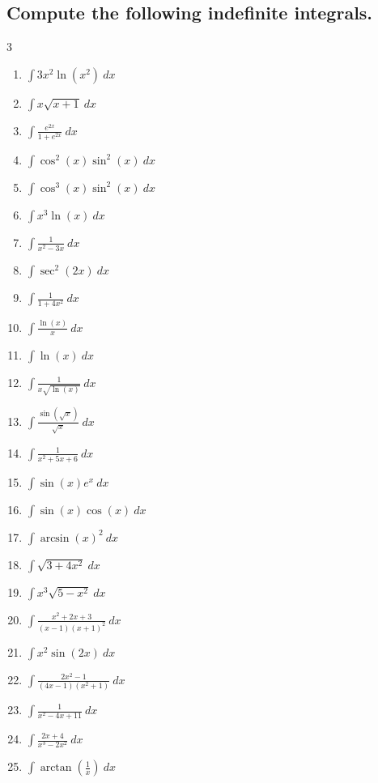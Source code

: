 \documentclass{article}
\begin{document}
\subsection{Compute the following indefinite integrals.}
\begin{multicols}{3}
\begin{enumerate}
\setlength{\itemsep}{0pt}
\item $\displaystyle \int 3x^2\ln(x^2)\ dx$
\item $\displaystyle \int x \sqrt{x+1}\ dx$
\item $\displaystyle \int \frac{e^{2 x}}{1+e^{2 x}} \ d x$
\item $\displaystyle \int  \cos^2(x)\sin^2(x)  \ d x$
\item $\displaystyle \int \cos ^3 (x) \sin ^2 (x)\ d x$
\item $\displaystyle \int x^3 \ln (x)\ d x$
\item $\displaystyle \int \frac{1}{x^2-3 x}\ dx$
\item $\displaystyle \int  \sec ^2(2 x)\ d x$
\item $\displaystyle \int  \frac{1}{1+4 x^2}\ dx$
\item $\displaystyle \int  \frac{\ln (x)}{x}\ d x$
\item $\displaystyle \int  \ln (x)\ d x$
\item $\displaystyle \int  \frac{1}{x\sqrt{\ln(x)}}\ d x$
\item $\displaystyle \int  \frac{\sin(\sqrt x)}{\sqrt x}\ d x$
\item $\displaystyle \int \frac{1}{x^2+5x+6} \ d x$
\item $\displaystyle \int  \sin(x)e^x \ d x$
\item $\displaystyle \int  \sin(x)\cos(x)\ d x$
\item $\displaystyle \int  \arcsin(x)^2\ d x$
\item $\displaystyle \int  \sqrt{3+4x^2}\ d x$
\item $\displaystyle \int  x^3\sqrt{5-x^2}\ d x$
\item $\displaystyle \int \frac{x^2+2 x+3}{(x-1)(x+1)^2}\ d x$
\item $\displaystyle \int x^2 \sin(2 x) \ d x$
\item $\displaystyle \int \frac{2x^2-1}{(4x-1)(x^2+1)} \ d x$
\item $\displaystyle \int \frac{1}{x^2-4x+11} \ d x$
\item $\displaystyle \int \frac{2x+4}{x^3-2x^2} \ d x$
\item $\displaystyle \int \arctan\left(\frac{1}{x}\right)\ d x$

\end{enumerate}
\end{multicols}
\end{document}
